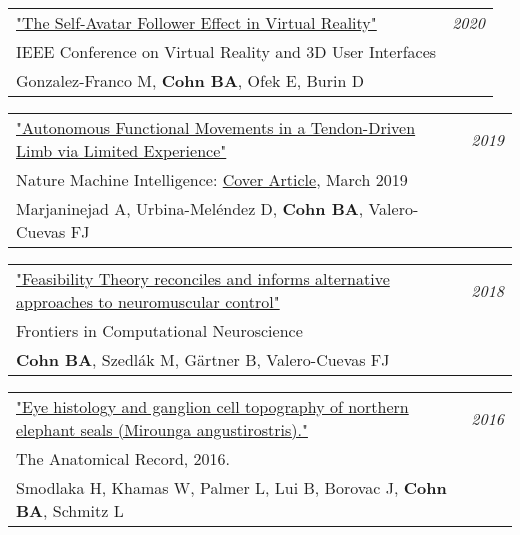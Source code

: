 \documentclass[10pt,a4paper]{article}
\begin{document}
\vspace*{1mm}\noindent\begin{tabularx}{17cm}{X r}
   \href{https://github.com/bc/resume/raw/master/papers/gonzalez-franco_et_al_ieeevr_2020.pdf}{
   "The Self-Avatar Follower Effect in Virtual Reality"} & \textit{2020}\\
    IEEE Conference on Virtual Reality and 3D User Interfaces \\
   Gonzalez-Franco M, \textbf{Cohn BA}, Ofek E, Burin D\\[2mm]
\end{tabularx}

\vspace*{1mm}\noindent\begin{tabularx}{17cm}{X r}
   \href{https://www.nature.com/articles/s42256-019-0029-0}{
   "Autonomous Functional Movements in a Tendon-Driven Limb via Limited Experience"} & \textit{2019}\\
    Nature Machine Intelligence: \href{https://github.com/bc/resume/blob/master/in_press/nature_machine_intelligence_2019.png}{Cover Article}, March 2019 \\
   Marjaninejad A, Urbina-Mel\'{e}ndez D, \textbf{Cohn BA}, Valero-Cuevas FJ \\[2mm]
\end{tabularx}


\vspace*{1mm}\noindent\begin{tabularx}{17cm}{X r}
   \href{https://github.com/bc/resume/raw/master/papers/cohn_et_al_2018_frontiers.pdf}{"Feasibility Theory reconciles and informs alternative approaches to neuromuscular control"} & \textit{2018}\\
   Frontiers in Computational Neuroscience \\
	 \textbf{Cohn BA}, Szedl\'{a}k M, G{\"a}rtner B, Valero-Cuevas FJ \\[2mm]
\end{tabularx}


\vspace*{1mm}\noindent\begin{tabularx}{17cm}{X r}
    \href{smodlaka_et_al_2016_the_anatomical_record.pdf}{"Eye histology and ganglion cell topography of northern elephant seals (Mirounga angustirostris)."}  & \textit{2016}\\
    The Anatomical Record, 2016. \\
    Smodlaka H, Khamas W, Palmer L, Lui B, Borovac J, \textbf{Cohn BA}, Schmitz L \\[2mm]
\end{tabularx}
\end{document}
